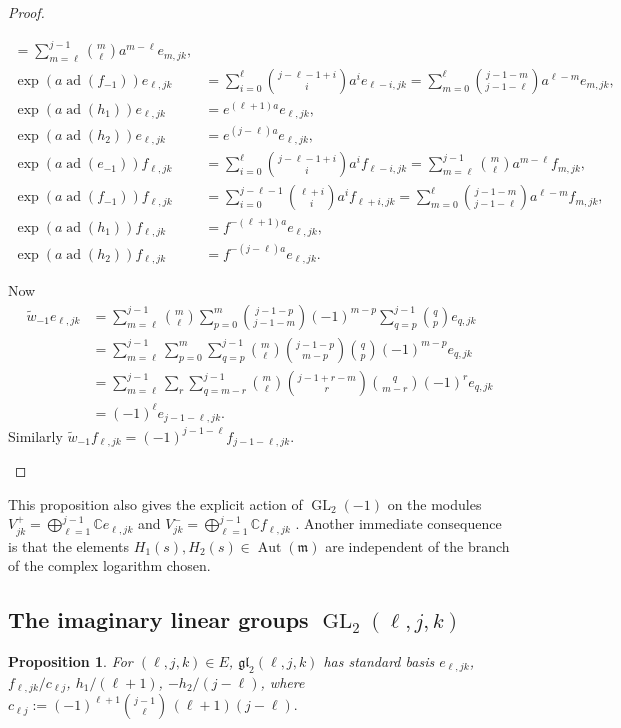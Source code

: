 \documentclass[11pt,letterpaper]{amsart}
\newcounter{thecounter}
\numberwithin{thecounter}{section}
\newtheorem{proposition}[thecounter]{Proposition}
\theoremstyle{definition}
\DeclareMathOperator{\GL}{GL}
\DeclareMathOperator{\Aut}{Aut}
\DeclareMathOperator{\ad}{ad}
\newcommand{\C}{{\mathbb C}}
\begin{document}
\begin{proof}
\begin{longver}
\begin{align*}
  =\sum_{m=\ell}^{j-1} \binom{m}{\ell}   a^{m-\ell}e_{m,jk}, \\
\exp(a\ad(f_{-1})) e_{\ell,jk} &=\sum_{i=0}^{\ell} \binom{j-\ell-1+i}{i} a^{i}e_{\ell-i,jk}
  = \sum_{m=0}^\ell   \binom{j-1-m}{j-1-\ell} a^{\ell-m}e_{m,jk} ,\\
\exp(a\ad(h_1)) e_{\ell,jk}&= e^{(\ell+1)a} e_{\ell,jk},\\
\exp(a\ad(h_2)) e_{\ell,jk}&= e^{(j-\ell)a} e_{\ell,jk},\\
\exp(a\ad(e_{-1})) f_{\ell,jk} &=\sum_{i=0}^{\ell} \binom{j-\ell-1+i}{i} a^{i}f_{\ell-i,jk}
  =\sum_{m=\ell}^{j-1} \binom{m}{\ell}   a^{m-\ell}f_{m,jk}, \\
\exp(a\ad(f_{-1})) f_{\ell,jk} &=\sum_{i=0}^{j-\ell-1} \binom{\ell+i}{i} a^{i}f_{\ell+i,jk}
  = \sum_{m=0}^\ell   \binom{j-1-m}{j-1-\ell} a^{\ell-m}f_{m,jk}, \\
\exp(a\ad(h_1)) f_{\ell,jk}&= f^{-(\ell+1)a} e_{\ell,jk},\\
\exp(a\ad(h_2)) f_{\ell,jk}&= f^{-(j-\ell)a} e_{\ell,jk}.
\end{align*}


Now 
\begin{align*}
\widetilde{w}_{-1} e_{\ell,jk} &= \sum_{m=\ell}^{j-1} \binom{m}{\ell}   \sum_{p=0}^m   \binom{j-1-p}{j-1-m} (-1)^{m-p} 
  \sum_{q=p}^{j-1}\binom{q}{p}  e_{q,jk}\\
&= \sum_{m=\ell}^{j-1}  \sum_{p=0}^m \sum_{q=p}^{j-1}  \binom{m}{\ell} \binom{j-1-p}{m-p} \binom{q}{p} (-1)^{m-p} e_{q,jk}\\
&=  \sum_{m=\ell}^{j-1} \sum_r \sum_{q=m-r}^{j-1}   \binom{m}{\ell} \binom{j-1+r-m}{r} \binom{q}{m-r} (-1)^{r} e_{q,jk}\\
&= (-1)^{\ell} e_{j-1-\ell,jk}.
\end{align*}
Similarly $\widetilde{w}_{-1} f_{\ell,jk} =(-1)^{j-1-\ell} f_{j-1-\ell,jk}$.
\end{longver}
\end{proof}


This proposition also gives the explicit action of $\GL_2(-1)$ on the modules $V^+_{jk} = \bigoplus_{\ell=1}^{j-1} \C e_{\ell,jk}$ and $V^-_{jk} = \bigoplus_{\ell=1}^{j-1} \C f_{\ell,jk}$ \cite{JurJPAA}.
Another immediate consequence is that the elements $H_1(s),H_2(s)\in\Aut(\mathfrak{m})$ are independent of the branch of the complex logarithm chosen.

\subsection{The imaginary linear groups $\GL_2(\ell,j,k)$}\label{SS-gl2im}
\begin{proposition}
For $(\ell,j,k)\in E$,  
$\mathfrak{gl}_2(\ell,j,k)$ %
has standard basis  ${e_{\ell,jk}}$, ${f_{\ell,jk}}/{{c_{\ell j}}}$, ${h_1}/{(\ell+1)}$,
 ${-h_2}/{(j-\ell)}$, where $c_{\ell j} := (-1)^{\ell+1} \binom{j-1}{\ell} \, (\ell+1)(j-\ell).$
\end{proposition}
\end{document}
